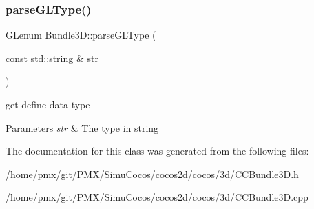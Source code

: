 \subsubsection{\texorpdfstring{parse\+G\+L\+Type()}{parseGLType()}\hspace{0.1cm}{\footnotesize\ttfamily [2/2]}}
{\footnotesize\ttfamily G\+Lenum Bundle3\+D\+::parse\+G\+L\+Type (\begin{DoxyParamCaption}\item[{const std\+::string \&}]{str }\end{DoxyParamCaption})\hspace{0.3cm}{\ttfamily [protected]}}

get define data type 
\begin{DoxyParams}{Parameters}
{\em str} & The type in string \\
\hline
\end{DoxyParams}


The documentation for this class was generated from the following files\+:\begin{DoxyCompactItemize}
\item 
/home/pmx/git/\+P\+M\+X/\+Simu\+Cocos/cocos2d/cocos/3d/C\+C\+Bundle3\+D.\+h\item 
/home/pmx/git/\+P\+M\+X/\+Simu\+Cocos/cocos2d/cocos/3d/C\+C\+Bundle3\+D.\+cpp\end{DoxyCompactItemize}
